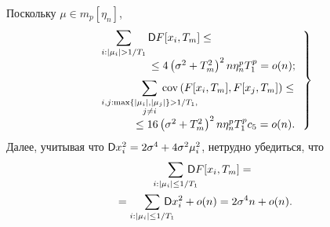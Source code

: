 \begin{multicols}{2}
Поскольку $\mu \in m_p[\eta_n]$,
\begin{equation}
\left.
\begin{array}{l}
 \displaystyle\sum\limits_{i: |\mu_i| > 1/T_1} {\mathsf D} F[x_i, T_m]  \leq{}\\
 \hspace*{15mm}{}\leq  4\left(\sigma^2 + T_m^2\right)^2 n \eta_n^p 
T_1^p = o(n);
\\[6pt]
\displaystyle \sum\limits_{\substack{{i,j: \max\{|\mu_i|, |\mu_j|\} > 1/T_1,}\\{j\neq i}}}  \hspace*{-12mm}\mathrm{cov}\,(F[x_i, 
T_m],F[x_j, T_m])  \leq{}\\
\hspace*{10mm}{}\leq 16\left(\sigma^2 + T_m^2\right)^2 n \eta_n^p T_1^p c_5 = o(n). 
\end{array}
\right\}    
\label{D2}
\end{equation}
Далее, учитывая что ${\mathsf D} x_i^2 \hm= 2\sigma^4 \hm+ 4\sigma^2 \mu_i^2$, нетрудно 
убедиться, что
\begin{multline}
\label{D3}
\sum\limits_{i: |\mu_i| \leq 1/T_1}\hspace*{-4mm} {\mathsf D} F[x_i, T_m] ={}\\
{}= \sum\limits_{i: |\mu_i| \leq 1/T_1} \hspace*{-4mm} {\mathsf D} 
x_i^2 + o(n) = 2\sigma^4 n + o(n).
\end{multline}



\end{multicols}
